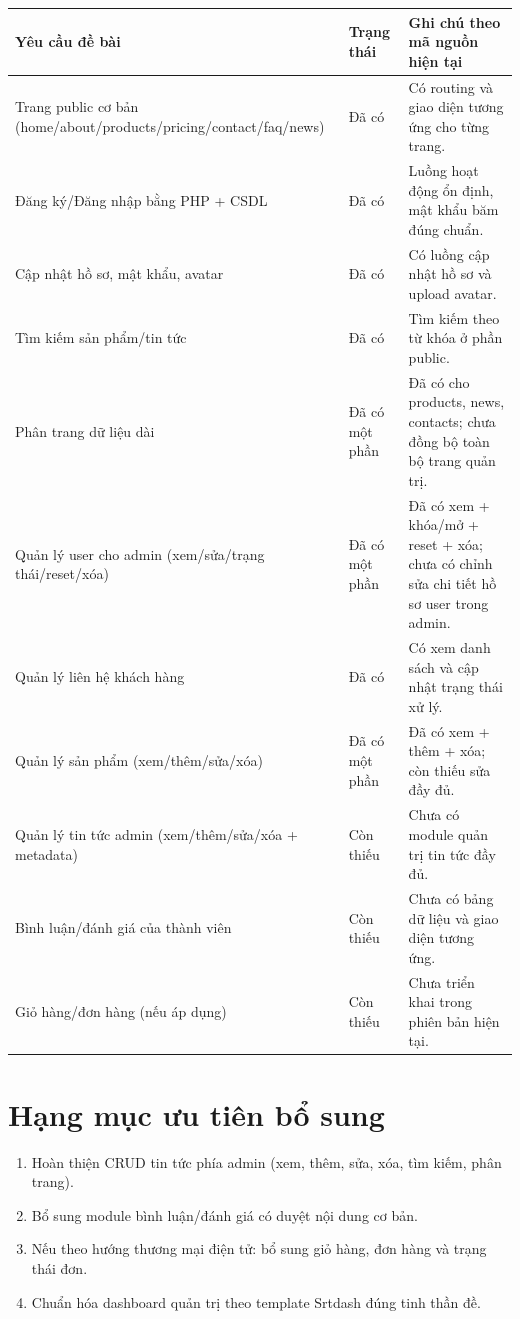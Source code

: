 \documentclass[12pt,a4paper]{article}
\begin{document}
\begin{longtable}{p{}p{}p{}}
\toprule
Yêu cầu đề bài & Trạng thái & Ghi chú theo mã nguồn hiện tại \\
\midrule
Trang public cơ bản (home/about/products/pricing/contact/faq/news) & Đã có & Có routing và giao diện tương ứng cho từng trang. \\
Đăng ký/Đăng nhập bằng PHP + CSDL & Đã có & Luồng hoạt động ổn định, mật khẩu băm đúng chuẩn. \\
Cập nhật hồ sơ, mật khẩu, avatar & Đã có & Có luồng cập nhật hồ sơ và upload avatar. \\
Tìm kiếm sản phẩm/tin tức & Đã có & Tìm kiếm theo từ khóa ở phần public. \\
Phân trang dữ liệu dài & Đã có một phần & Đã có cho products, news, contacts; chưa đồng bộ toàn bộ trang quản trị. \\
Quản lý user cho admin (xem/sửa/trạng thái/reset/xóa) & Đã có một phần & Đã có xem + khóa/mở + reset + xóa; chưa có chỉnh sửa chi tiết hồ sơ user trong admin. \\
Quản lý liên hệ khách hàng & Đã có & Có xem danh sách và cập nhật trạng thái xử lý. \\
Quản lý sản phẩm (xem/thêm/sửa/xóa) & Đã có một phần & Đã có xem + thêm + xóa; còn thiếu sửa đầy đủ. \\
Quản lý tin tức admin (xem/thêm/sửa/xóa + metadata) & Còn thiếu & Chưa có module quản trị tin tức đầy đủ. \\
Bình luận/đánh giá của thành viên & Còn thiếu & Chưa có bảng dữ liệu và giao diện tương ứng. \\
Giỏ hàng/đơn hàng (nếu áp dụng) & Còn thiếu & Chưa triển khai trong phiên bản hiện tại. \\
\bottomrule
\end{longtable}

\section{Hạng mục ưu tiên bổ sung}

\begin{enumerate}
  \item Hoàn thiện CRUD tin tức phía admin (xem, thêm, sửa, xóa, tìm kiếm, phân trang).
  \item Bổ sung module bình luận/đánh giá có duyệt nội dung cơ bản.
  \item Nếu theo hướng thương mại điện tử: bổ sung giỏ hàng, đơn hàng và trạng thái đơn.
  \item Chuẩn hóa dashboard quản trị theo template Srtdash đúng tinh thần đề.
\end{enumerate}
\end{document}
